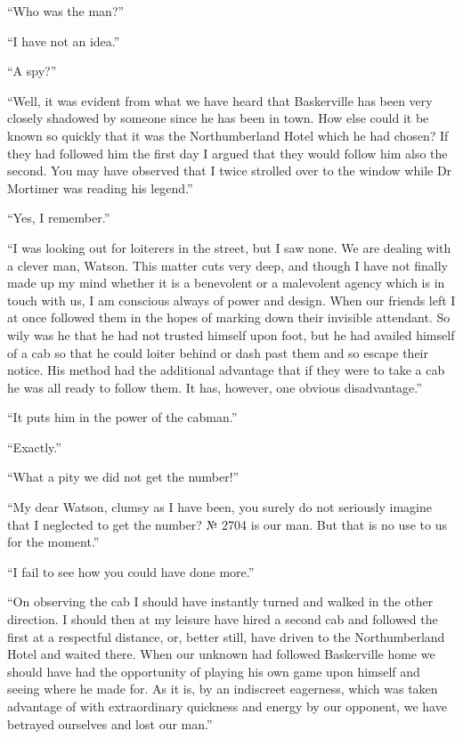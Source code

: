 \documentclass[paper=5.5in:8.5in,BCOR=7mm,twoside,DIV=calc,12pt,usegeometry,openany,chapterprefix,endperiod,headings=big]{scrbook} %
\begin{document}
\enquote{Who was the man?}

\enquote{I have not an idea.}

\enquote{A spy?}

\enquote{Well, it was evident from what we have heard that Baskerville has been very closely shadowed by someone since he has been in town. How else could it be known so quickly that it was the Northumberland Hotel which he had chosen? If they had followed him the first day I argued that they would follow him also the second. You may have observed that I twice strolled over to the window while Dr Mortimer was reading his legend.}

\enquote{Yes, I remember.}

\enquote{I was looking out for loiterers in the street, but I saw none. We are dealing with a clever man, Watson. This matter cuts very deep, and though I have not finally made up my mind whether it is a benevolent or a malevolent agency which is in touch with us, I am conscious always of power and design. When our friends left I at once followed them in the hopes of marking down their invisible attendant. So wily was he that he had not trusted himself upon foot, but he had availed himself of a cab so that he could loiter behind or dash past them and so escape their notice. His method had the additional advantage that if they were to take a cab he was all ready to follow them. It has, however, one obvious disadvantage.}

\enquote{It puts him in the power of the cabman.}

\enquote{Exactly.}

\enquote{What a pity we did not get the number!}

\enquote{My dear Watson, clumsy as I have been, you surely do not seriously imagine that I neglected to get the number? № 2704 is our man. But that is no use to us for the moment.}

\enquote{I fail to see how you could have done more.}

\enquote{On observing the cab I should have instantly turned and walked in the other direction. I should then at my leisure have hired a second cab and followed the first at a respectful distance, or, better still, have driven to the Northumberland Hotel and waited there. When our unknown had followed Baskerville home we should have had the opportunity of playing his own game upon himself and seeing where he made for. As it is, by an indiscreet eagerness, which was taken advantage of with extraordinary quickness and energy by our opponent, we have betrayed ourselves and lost our man.}
\end{document}
